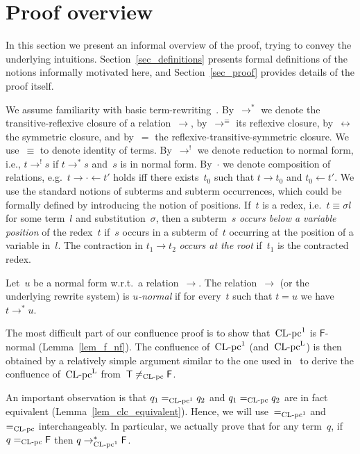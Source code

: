 \documentclass[a4paper,UKenglish]{lipics-v2016}
\newcommand{\Fs}{\mathsf{F}}
\newcommand{\Ts}{\mathsf{T}}
\newcommand{\from}{\ensuremath{\leftarrow}}
\newcommand{\reduces}{\ensuremath{\to^*}}
\newcommand{\CLC}{{\mbox{${\text{\rm CL-pc}^1}$}}}
\newcommand{\CLCp}{{\mbox{$\text{\rm CL-pc}^{\mathrm{L}}$}}}
\newcommand{\sCLC}{{\ensuremath{\text{\rm CL-pc}^1}}}
\newcommand{\sCLCz}{\ensuremath{\text{\rm CL-pc}}}
\begin{document}
\section{Proof overview}\label{sec_overview}

In this section we present an informal overview of the proof, trying
to convey the underlying intuitions. Section~\ref{sec_definitions}
presents formal definitions of the notions informally motivated here,
and Section~\ref{sec_proof} provides details of the proof itself.

We assume familiarity with basic
term-rewriting~\cite{BaaderNipkow1999,Terese2003}. By~$\to^*$ we
denote the transitive-reflexive closure of a relation~$\to$,
by~$\to^\equiv$ its reflexive closure, by~$\leftrightarrow$ the
symmetric closure, and by~$=$ the reflexive-transitive-symmetric
closure. We use~$\equiv$ to denote identity of terms. By~$\to^!$ we
denote reduction to normal form, i.e., $t \to^! s$ if $t \reduces s$
and~$s$ is in normal form. By~$\cdot$ we denote composition of
relations, e.g.~$t \to \cdot \from t'$ holds iff there exists~$t_0$
such that $t \to t_0$ and $t_0 \from t'$. We use the standard notions
of subterms and subterm occurrences, which could be formally defined
by introducing the notion of positions. If~$t$ is a redex,
i.e.~$t \equiv \sigma l$ for some term~$l$ and substitution~$\sigma$,
then a subterm~$s$ \emph{occurs below a variable position} of the
redex~$t$ if~$s$ occurs in a subterm of~$t$ occurring at the position
of a variable in~$l$. The contraction in $t_1 \to t_2$ \emph{occurs at
  the root} if~$t_1$ is the contracted redex.

Let~$u$ be a normal form w.r.t.~a relation~$\to$. The relation~$\to$
(or the underlying rewrite system) is \emph{$u$-normal} if for
every~$t$ such that $t = u$ we have $t \reduces u$.

The most difficult part of our confluence proof is to show that~$\CLC$
is $\Fs$-normal (Lemma~\ref{lem_f_nf}). The confluence of~$\CLC$
(and~$\CLCp$) is then obtained by a relatively simple argument similar
to the one used in~\cite{Vrijer1999} to derive the confluence
of~$\CLCp$ from~$\Ts \ne_{\sCLCz} \Fs$.

An important observation is that $q_1 =_{\sCLC} q_2$ and
$q_1 =_{\sCLCz} q_2$ are in fact equivalent
(Lemma~\ref{lem_clc_equivalent}). Hence, we will use~${=_{\sCLC}}$
and~${=_{\sCLCz}}$ interchangeably. In particular, we actually prove
that for any term~$q$, if $q =_{\sCLCz} \Fs$ then
$q \reduces_{\sCLC} \Fs$.
\end{document}
